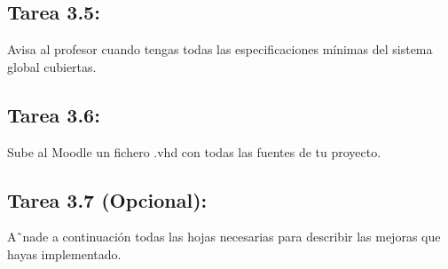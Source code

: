 \documentclass{article}
\begin{document}
\subsection{Tarea 3.5:}
Avisa al profesor cuando tengas todas las especificaciones mínimas del sistema global cubiertas.

\subsection{Tarea 3.6:
}
Sube al Moodle un fichero .vhd con todas las fuentes de tu proyecto.

\subsection{Tarea 3.7 (Opcional):}
A˜nade a continuación todas las hojas necesarias para describir las mejoras que hayas implementado.
\end{document}
